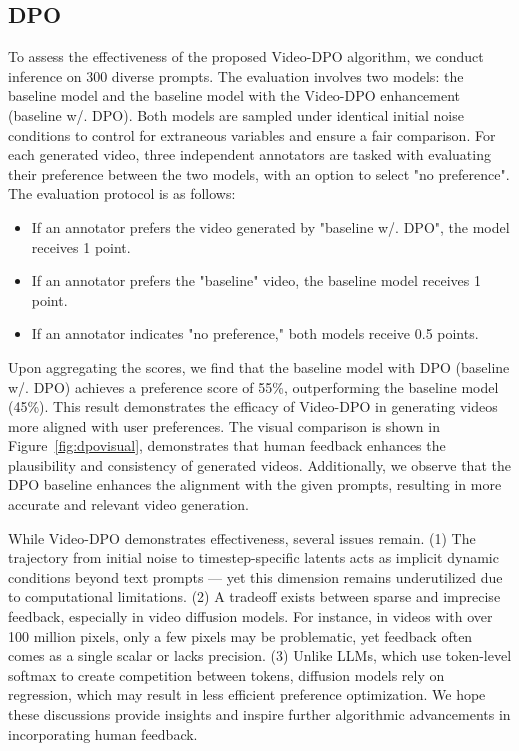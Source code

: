 \subsection{DPO}
To assess the effectiveness of the proposed Video-DPO algorithm, we conduct inference on 300 diverse prompts. The evaluation involves two models: the baseline model and the baseline model with the Video-DPO enhancement (baseline w/. DPO). Both models are sampled under identical initial noise conditions to control for extraneous variables and ensure a fair comparison. For each generated video, three independent annotators are tasked with evaluating their preference between the two models, with an option to select "no preference". The evaluation protocol is as follows: 
\begin{itemize}[left=0cm]
    \item If an annotator prefers the video generated by "baseline w/. DPO", the model receives 1 point.
    \item If an annotator prefers the "baseline" video, the baseline model receives 1 point.
    \item If an annotator indicates "no preference," both models receive 0.5 points.
\end{itemize}
Upon aggregating the scores, we find that the baseline model with DPO (baseline w/. DPO) achieves a preference score of 55\%, outperforming the baseline model (45\%). This result demonstrates the efficacy of Video-DPO in generating videos more aligned with user preferences. The visual comparison is shown in Figure~\ref{fig:dpovisual}, demonstrates that human feedback enhances the plausibility and consistency of generated videos. Additionally, we observe that the DPO baseline enhances the alignment with the given prompts, resulting in more accurate and relevant video generation. 

While Video-DPO demonstrates effectiveness, several issues remain. (1) The trajectory from initial noise to timestep-specific latents acts as implicit dynamic conditions beyond text prompts — yet this dimension remains underutilized due to computational limitations. (2)  A tradeoff exists between sparse and imprecise feedback, especially in video diffusion models. For instance, in videos with over 100 million pixels, only a few pixels may be problematic, yet feedback often comes as a single scalar or lacks precision. (3) Unlike LLMs, which use token-level softmax to create competition between tokens, diffusion models rely on regression, which may result in less efficient preference optimization. We hope these discussions provide insights and inspire further algorithmic advancements in incorporating human feedback.



